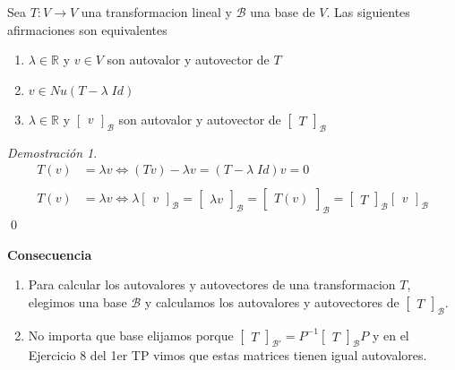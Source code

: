 \documentclass{article}
\theoremstyle{definition}
\theoremstyle{definition}
\theoremstyle{remark}
\newtheorem*{demo}{Demostración}
\begin{document}
\begin{lema}
  Sea $T : V \to V$ una transformacion lineal y $\mathcal{B}$ una base de $V$. Las siguientes afirmaciones son equivalentes \begin{enumerate}[label=$\circ$]
    \item $\lambda \in \mathbb{R}$ y $v \in V$ son autovalor y autovector de $T$
    \item $v \in Nu(T-\lambda \; Id)$
    \item $\lambda \in \mathbb{R}$ y $\begin{bmatrix}v\end{bmatrix}_{\mathcal{B}}$ son autovalor y autovector de $\begin{bmatrix}T\end{bmatrix}_{\mathcal{B}}$
  \end{enumerate}
\end{lema}
\begin{demo}
  \[
    \begin{aligned}
      T(v) &= \lambda v \Leftrightarrow (Tv)-\lambda v=(T-\lambda \; Id)v=0 \\\\
      T(v) &= \lambda v \Leftrightarrow \lambda \begin{bmatrix}v\end{bmatrix}_{\mathcal{B}}=\begin{bmatrix}\lambda v\end{bmatrix}_{\mathcal{B}}=\begin{bmatrix}T(v)\end{bmatrix}_{\mathcal{B}}=\begin{bmatrix}T\end{bmatrix}_{\mathcal{B}}\begin{bmatrix}v\end{bmatrix}_{\mathcal{B}}
    \end{aligned}
  \]\qed
\end{demo}
\textbf{Consecuencia} \begin{enumerate}[label=$\circ$]
  \item Para calcular los autovalores y autovectores de una transformacion $T$, elegimos una base $\mathcal{B}$ y calculamos los autovalores y autovectores de $\begin{bmatrix}T\end{bmatrix}_{\mathcal{B}}$. 
  \item No importa que base elijamos porque $\begin{bmatrix}T\end{bmatrix}_{\mathcal{B'}}=P^{-1}\begin{bmatrix}T\end{bmatrix}_{\mathcal{B}}P$ y en el Ejercicio 8 del 1er TP vimos que estas matrices tienen igual autovalores.
\end{enumerate}\pagebreak
\end{document}
